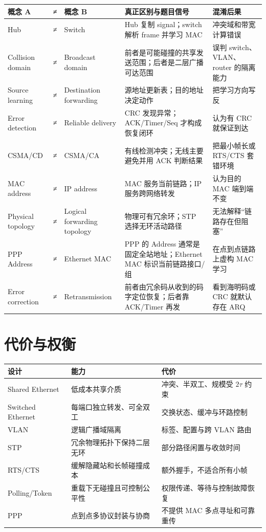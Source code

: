 \documentclass[UTF8,fontset=none,11pt,a4paper]{ctexart}
\begin{document}
\begin{longtable}[]{@{}lclll@{}}
\toprule\noalign{}
概念 A & ≠ & 概念 B & 真正区别与题目信号 & 混淆后果 \\
\midrule\noalign{}
\endhead
\bottomrule\noalign{}
\endlastfoot
Hub & ≠ & Switch & Hub 复制 signal；switch 解析 frame 并学习 MAC &
冲突域和带宽计算错误 \\
Collision domain & ≠ & Broadcast domain &
前者是可能碰撞的共享发送范围；后者是二层广播可达范围 & 误判
switch、VLAN、router 的隔离能力 \\
Source learning & ≠ & Destination forwarding &
源地址更新表；目的地址决定动作 & 把学习方向写反 \\
Error detection & ≠ & Reliable delivery & CRC 发现异常；ACK/Timer/Seq
才构成恢复闭环 & 认为有 CRC 就保证到达 \\
CSMA/CD & ≠ & CSMA/CA & 有线检测冲突；无线主要避免并用 ACK 判断结果 &
把最小帧长或 RTS/CTS 套错环境 \\
MAC address & ≠ & IP address & MAC 服务当前链路；IP 服务跨网络转发 &
认为目的 MAC 端到端不变 \\
Physical topology & ≠ & Logical forwarding topology &
物理可有冗余环；STP 选择无环活动路径 & 无法解释``链路存在但阻塞'' \\
PPP Address & ≠ & Ethernet MAC & PPP 的 Address 通常是固定全站地址；Ethernet MAC 标识当前链路接口/组 & 在点到点链路上虚构 MAC 学习 \\
Error correction & ≠ & Retransmission & 前者由冗余码从收到的码字定位恢复；后者靠 ACK/Timer 再发 & 看到海明码或 CRC 就默认存在 ARQ \\
\end{longtable}

\section{代价与权衡}\label{10-ux4ee3ux4ef7ux4e0eux6743ux8861}

\begin{longtable}[]{@{}lll@{}}
\toprule\noalign{}
设计 & 能力 & 代价 \\
\midrule\noalign{}
\endhead
\bottomrule\noalign{}
\endlastfoot
Shared Ethernet & 低成本共享介质 & 冲突、半双工、规模受 \(2\tau\)
约束 \\
Switched Ethernet & 每端口独立转发、可全双工 &
交换状态、缓冲与环路控制 \\
VLAN & 逻辑广播域隔离 & 标签、配置与跨 VLAN 路由 \\
STP & 冗余物理拓扑下保持二层无环 & 部分路径闲置与收敛时间 \\
RTS/CTS & 缓解隐藏站和长帧碰撞成本 & 额外握手，不适合所有小帧 \\
Polling/Token & 重载下无碰撞且可控制公平性 & 权限传递、等待与控制故障恢复 \\
PPP & 点到点多协议封装与协商 & 不提供 MAC 多点寻址和可靠重传 \\
\end{longtable}
\end{document}
